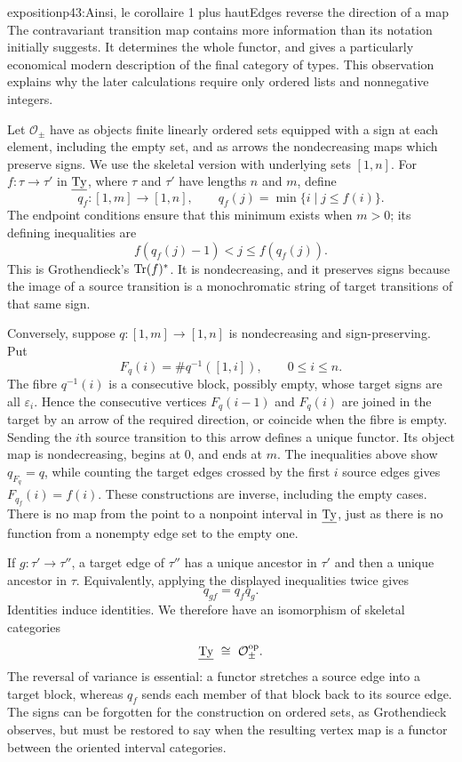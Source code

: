 \begin{dcomment}{exposition}{p43:Ainsi, le corollaire 1 plus haut}{Edges reverse the direction of a map}
The contravariant transition map contains more information than its notation initially suggests. It determines the whole functor, and gives a particularly economical modern description of the final category of types. This observation explains why the later calculations require only ordered lists and nonnegative integers.

Let $\mathcal O_{\pm}$ have as objects finite linearly ordered sets equipped with a sign at each element, including the empty set, and as arrows the nondecreasing maps which preserve signs. We use the skeletal version with underlying sets $[1,n]$. For $f:\tau\to\tau'$ in $\underline{\mathrm{Ty}}$, where $\tau$ and $\tau'$ have lengths $n$ and $m$, define
\[
 q_f:[1,m]\longrightarrow[1,n],\qquad
 q_f(j)=\min\{i\mid j\leq f(i)\}.
\]
The endpoint conditions ensure that this minimum exists when $m>0$; its defining inequalities are
\[
 f(q_f(j)-1)<j\leq f(q_f(j)).
\]
This is Grothendieck's $\mathrm{Tr}(f)^*$. It is nondecreasing, and it preserves signs because the image of a source transition is a monochromatic string of target transitions of that same sign.

Conversely, suppose $q:[1,m]\to[1,n]$ is nondecreasing and sign-preserving. Put
\[
 F_q(i)=\#q^{-1}([1,i]),\qquad 0\leq i\leq n.
\]
The fibre $q^{-1}(i)$ is a consecutive block, possibly empty, whose target signs are all $\varepsilon_i$. Hence the consecutive vertices $F_q(i-1)$ and $F_q(i)$ are joined in the target by an arrow of the required direction, or coincide when the fibre is empty. Sending the $i$th source transition to this arrow defines a unique functor. Its object map is nondecreasing, begins at $0$, and ends at $m$. The inequalities above show $q_{F_q}=q$, while counting the target edges crossed by the first $i$ source edges gives $F_{q_f}(i)=f(i)$. These constructions are inverse, including the empty cases. There is no map from the point to a nonpoint interval in $\underline{\mathrm{Ty}}$, just as there is no function from a nonempty edge set to the empty one.

If $g:\tau'\to\tau''$, a target edge of $\tau''$ has a unique ancestor in $\tau'$ and then a unique ancestor in $\tau$. Equivalently, applying the displayed inequalities twice gives
\[
 q_{gf}=q_fq_g.
\]
Identities induce identities. We therefore have an isomorphism of skeletal categories
\[
 \underline{\mathrm{Ty}}\ \cong\ \mathcal O_{\pm}^{\mathrm{op}}.
\]
The reversal of variance is essential: a functor stretches a source edge into a target block, whereas $q_f$ sends each member of that block back to its source edge. The signs can be forgotten for the construction on ordered sets, as Grothendieck observes, but must be restored to say when the resulting vertex map is a functor between the oriented interval categories.


\end{dcomment}
